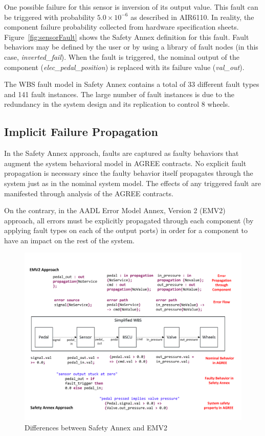 One possible failure for this sensor is inversion of its output value. This fault can be triggered with probability $5.0\times 10^{-6}$ as described in AIR6110. In reality, the component failure probability %
collected from hardware specification sheets.  Figure~\ref{fig:sensorFault} shows the Safety Annex definition for this fault. Fault behaviors may be defined by the user or by using a library of fault nodes (in this case, \textit{inverted\_fail}).  When the fault is triggered, the nominal output of the component (\textit{elec\_pedal\_position}) is replaced with its failure value (\textit{val\_out}). 

The WBS fault model in Safety Annex contains a total of 33 different fault types and 141 fault instances. The large number of fault instances is due to the redundancy in the system design and its replication to control 8 wheels.

\subsection{Implicit Failure Propagation}
In the Safety Annex approach, faults are captured as faulty behaviors that augment the system behavioral model in AGREE contracts. No explicit fault propagation is necessary since the faulty behavior itself propagates through the system just as in the nominal system model. The effects of any triggered fault are manifested through analysis of the AGREE contracts. 

On the contrary, in the AADL Error Model Annex, Version 2 (EMV2)~\cite{EMV2} approach, all errors must be explicitly propagated through each component (by applying fault types on each of the output ports) in order for a component to have an impact on the rest of the system. 

\begin{figure}[t]
	\vspace{-0.19in}
	\centering
	\includegraphics[trim=0 9 0 5,clip,width=\textwidth]{images/Comparison_with_EMV2.pdf}
	\caption{Differences between Safety Annex and EMV2}
	\label{fig:comparison_with_EMV2}
\end{figure} 


